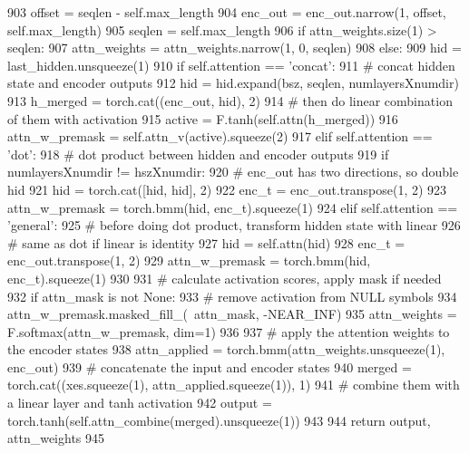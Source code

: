 \begin{DoxyCode}
903                 offset = seqlen - self.max\_length
904                 enc\_out = enc\_out.narrow(1, offset, self.max\_length)
905                 seqlen = self.max\_length
906             \textcolor{keywordflow}{if} attn\_weights.size(1) > seqlen:
907                 attn\_weights = attn\_weights.narrow(1, 0, seqlen)
908         \textcolor{keywordflow}{else}:
909             hid = last\_hidden.unsqueeze(1)
910             \textcolor{keywordflow}{if} self.attention == \textcolor{stringliteral}{'concat'}:
911                 \textcolor{comment}{# concat hidden state and encoder outputs}
912                 hid = hid.expand(bsz, seqlen, numlayersXnumdir)
913                 h\_merged = torch.cat((enc\_out, hid), 2)
914                 \textcolor{comment}{# then do linear combination of them with activation}
915                 active = F.tanh(self.attn(h\_merged))
916                 attn\_w\_premask = self.attn\_v(active).squeeze(2)
917             \textcolor{keywordflow}{elif} self.attention == \textcolor{stringliteral}{'dot'}:
918                 \textcolor{comment}{# dot product between hidden and encoder outputs}
919                 \textcolor{keywordflow}{if} numlayersXnumdir != hszXnumdir:
920                     \textcolor{comment}{# enc\_out has two directions, so double hid}
921                     hid = torch.cat([hid, hid], 2)
922                 enc\_t = enc\_out.transpose(1, 2)
923                 attn\_w\_premask = torch.bmm(hid, enc\_t).squeeze(1)
924             \textcolor{keywordflow}{elif} self.attention == \textcolor{stringliteral}{'general'}:
925                 \textcolor{comment}{# before doing dot product, transform hidden state with linear}
926                 \textcolor{comment}{# same as dot if linear is identity}
927                 hid = self.attn(hid)
928                 enc\_t = enc\_out.transpose(1, 2)
929                 attn\_w\_premask = torch.bmm(hid, enc\_t).squeeze(1)
930 
931             \textcolor{comment}{# calculate activation scores, apply mask if needed}
932             \textcolor{keywordflow}{if} attn\_mask \textcolor{keywordflow}{is} \textcolor{keywordflow}{not} \textcolor{keywordtype}{None}:
933                 \textcolor{comment}{# remove activation from NULL symbols}
934                 attn\_w\_premask.masked\_fill\_(~attn\_mask, -NEAR\_INF)
935             attn\_weights = F.softmax(attn\_w\_premask, dim=1)
936 
937         \textcolor{comment}{# apply the attention weights to the encoder states}
938         attn\_applied = torch.bmm(attn\_weights.unsqueeze(1), enc\_out)
939         \textcolor{comment}{# concatenate the input and encoder states}
940         merged = torch.cat((xes.squeeze(1), attn\_applied.squeeze(1)), 1)
941         \textcolor{comment}{# combine them with a linear layer and tanh activation}
942         output = torch.tanh(self.attn\_combine(merged).unsqueeze(1))
943 
944         \textcolor{keywordflow}{return} output, attn\_weights
945 \end{DoxyCode}


